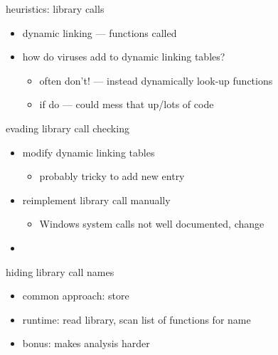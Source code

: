 \begin{frame}{heuristics: library calls}
    \begin{itemize}
    \item dynamic linking --- functions called 
    \item how do viruses add to dynamic linking tables?
        \begin{itemize}
        \item often don't! --- instead dynamically look-up functions
        \item if do --- could mess that up/lots of code
        \end{itemize}
    \end{itemize}

\end{frame}

\begin{frame}{evading library call checking}
    \begin{itemize}
    \item modify dynamic linking tables
        \begin{itemize}
        \item probably tricky to add new entry
        \end{itemize}
    \item reimplement library call manually
        \begin{itemize}
        \item Windows system calls not well documented, change
        \end{itemize}
    \item {}
    \end{itemize}
\end{frame}

\begin{frame}{hiding library call names}
    \begin{itemize}
    \item common approach: store 
    \item runtime: read library, scan list of functions for name
    \vspace{.5cm}
    \item bonus: makes analysis harder
    \end{itemize}
\end{frame}

